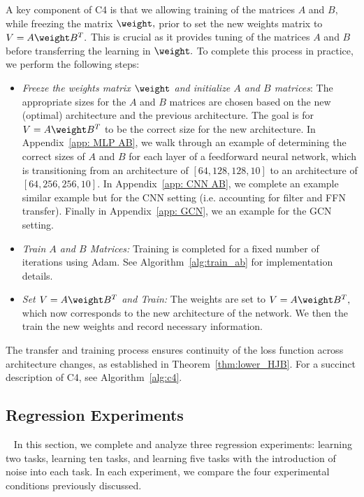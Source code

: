 A key component of C4 is that we allowing training of the matrices $A$ and $B,$ while freezing the matrix $\weight,$ prior to set the new weights matrix to $V = A \weight B^T.$ This is crucial as it provides tuning of the matrices $A$ and $B$ before transferring the learning in $\weight.$
To complete this process in practice, we perform the following steps:
\begin{itemize}
    \item[(1)] \textit{Freeze the weights matrix $\weight$ and initialize $A$ and $B$ matrices}: The appropriate sizes for the $A$ and $B$ matrices are chosen based on the new (optimal) architecture and the previous architecture. The goal is for $V = A \weight B^T$ to be the correct size for the new architecture. In Appendix~\ref{app: MLP AB}, we walk through an example of determining the correct sizes of $A$ and $B$ for each layer of a feedforward neural network, which is transitioning from an architecture of  $[64,128,128,10]$ to an architecture of $[64,256,256,10].$ In Appendix~\ref{app: CNN AB}, we complete an example similar example but for the CNN setting (i.e. accounting for filter and FFN transfer). Finally in Appendix~\ref{app: GCN}, we an example for the GCN setting.\\
    
    \item[(2)]\textit{Train $A$ and $B$ Matrices:} Training is completed for a fixed number of iterations using Adam. See Algorithm~\ref{alg:train_ab} for implementation details.\\

    \item[(3)] \textit{Set $V = A\weight B^T$ and Train: } The weights are set to $V = A\weight B^T,$ which now corresponds to the new architecture of the network. We then the train the new weights and record necessary information. 
\end{itemize}

The transfer and training process ensures continuity of the loss function across architecture changes, as established in Theorem~\ref{thm:lower_HJB}. For a succinct description of C4, see Algorithm~\ref{alg:c4}.

\subsection{Regression Experiments}~\label{sec:reg}
In this section, we complete and analyze  three regression experiments: learning two tasks, learning ten tasks, and learning five tasks with the introduction of noise into each task. In each experiment, we compare the four experimental conditions previously discussed.

